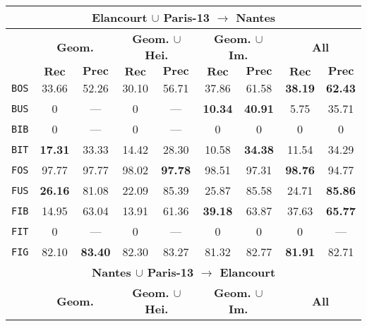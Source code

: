\begin{table}
\begin{center}
\begin{tabular}{|c | c c | c c | c c | c c |}
                    \hline
                    \hline
                    \multicolumn{9}{|c|}{\textbf{Elancourt $\cup$ Paris-13 $\rightarrow$ Nantes}}\\
                    \hline
                    &\multicolumn{2}{c|}{\textbf{Geom.}} & \multicolumn{2}{c|}{\textbf{Geom. $\cup$ Hei.}} & \multicolumn{2}{c|}{\textbf{Geom. $\cup$ Im.}} & \multicolumn{2}{x{2.4cm}|}{\textbf{All}}\\
                    \cline{2-9}
                    & $\bm{Rec}$ & $\bm{Prec}$ &  $\bm{Rec}$ & $\bm{Prec}$ &  $\bm{Rec}$ & $\bm{Prec}$ &  $\bm{Rec}$ & $\bm{Prec}$ \\
                    \hline
                    \texttt{BOS} & 33.66 & 52.26 & 30.10 & 56.71 & 37.86 & 61.58 & \textbf{38.19} & \textbf{62.43} \\
                    \hline
                    \texttt{BUS} & 0 & --- & 0 & --- & \textbf{10.34} & \textbf{40.91} & 5.75 & 35.71 \\
                    \hline
                    \texttt{BIB} & 0 & --- & 0 & --- & 0 & 0 & 0 & 0 \\
                    \hline
                    \texttt{BIT} & \textbf{17.31} & 33.33 & 14.42 & 28.30 & 10.58 & \textbf{34.38} & 11.54 & 34.29 \\
                    \hline
                    \texttt{FOS} & 97.77 & 97.77 & 98.02 & \textbf{97.78} & 98.51 & 97.31 & \textbf{98.76} & 94.77 \\
                    \hline
                    \texttt{FUS} & \textbf{26.16} & 81.08 & 22.09 & 85.39 & 25.87 & 85.58 & 24.71 & \textbf{85.86} \\
                    \hline
                    \texttt{FIB} & 14.95 & 63.04 & 13.91 & 61.36 & \textbf{39.18} & 63.87 & 37.63 & \textbf{65.77} \\
                    \hline
                    \texttt{FIT} & 0 & --- & 0 & --- & 0 & 0 & 0 & --- \\
                    \hline
                    \texttt{FIG} & 82.10 & \textbf{83.40} & 82.30 & 83.27 & 81.32 & 82.77 & \textbf{81.91} & 82.71 \\
                    \hline
                    \hline
                    \multicolumn{9}{|c|}{\textbf{Nantes $\cup$ Paris-13 $\rightarrow$ Elancourt}}\\
                    \hline
                    &\multicolumn{2}{c|}{\textbf{Geom.}} & \multicolumn{2}{c|}{\textbf{Geom. $\cup$ Hei.}} & \multicolumn{2}{c|}{\textbf{Geom. $\cup$ Im.}} & \multicolumn{2}{x{2.4cm}|}{\textbf{All}}\\

\end{tabular}
\end{center}
\end{table}
